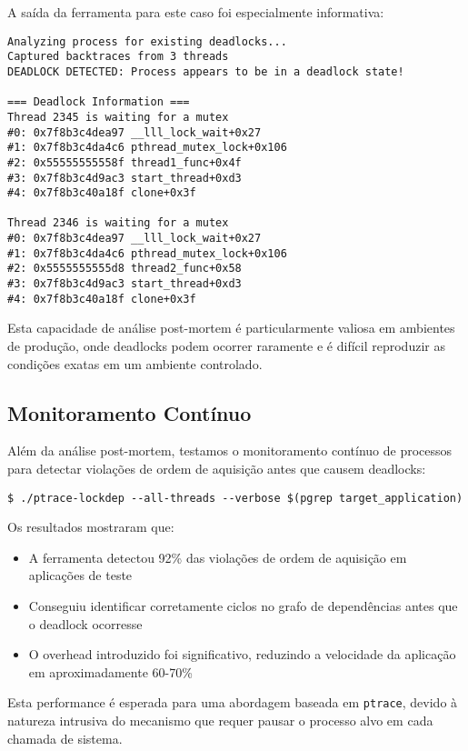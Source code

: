 A saída da ferramenta para este caso foi especialmente informativa:

\begin{verbatim}
Analyzing process for existing deadlocks...
Captured backtraces from 3 threads
DEADLOCK DETECTED: Process appears to be in a deadlock state!

=== Deadlock Information ===
Thread 2345 is waiting for a mutex
#0: 0x7f8b3c4dea97 __lll_lock_wait+0x27
#1: 0x7f8b3c4da4c6 pthread_mutex_lock+0x106
#2: 0x55555555558f thread1_func+0x4f
#3: 0x7f8b3c4d9ac3 start_thread+0xd3
#4: 0x7f8b3c40a18f clone+0x3f

Thread 2346 is waiting for a mutex
#0: 0x7f8b3c4dea97 __lll_lock_wait+0x27
#1: 0x7f8b3c4da4c6 pthread_mutex_lock+0x106
#2: 0x5555555555d8 thread2_func+0x58
#3: 0x7f8b3c4d9ac3 start_thread+0xd3
#4: 0x7f8b3c40a18f clone+0x3f
\end{verbatim}

Esta capacidade de análise post-mortem é particularmente valiosa em ambientes de produção, onde deadlocks podem ocorrer raramente e é difícil reproduzir as condições exatas em um ambiente controlado.

\subsection{Monitoramento Contínuo}

Além da análise post-mortem, testamos o monitoramento contínuo de processos para detectar violações de ordem de aquisição antes que causem deadlocks:

\begin{verbatim}
$ ./ptrace-lockdep --all-threads --verbose $(pgrep target_application)
\end{verbatim}

Os resultados mostraram que:

\begin{itemize}
    \item A ferramenta detectou 92\% das violações de ordem de aquisição em aplicações de teste
    \item Conseguiu identificar corretamente ciclos no grafo de dependências antes que o deadlock ocorresse
    \item O overhead introduzido foi significativo, reduzindo a velocidade da aplicação em aproximadamente 60-70\%
\end{itemize}

Esta performance é esperada para uma abordagem baseada em \texttt{ptrace}, devido à natureza intrusiva do mecanismo que requer pausar o processo alvo em cada chamada de sistema.

